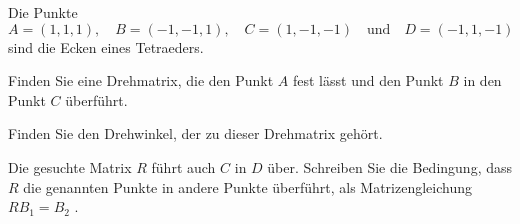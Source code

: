 Die Punkte
\[
A=( 1, 1, 1),\quad
B=(-1,-1, 1),\quad
C=( 1,-1,-1)
\quad\text{und}\quad
D=(-1, 1,-1)
\]
sind die Ecken eines Tetraeders.
\begin{teilaufgaben}
\item
Finden Sie eine Drehmatrix, die den Punkt $A$ fest lässt und den
Punkt $B$ in den Punkt $C$ überführt.
\item
Finden Sie den Drehwinkel, der zu dieser Drehmatrix gehört.
\end{teilaufgaben}


\begin{hinweis}
Die gesuchte Matrix $R$ führt auch $C$ in $D$ über.
Schreiben Sie die Bedingung, dass $R$ die genannten Punkte in andere
Punkte überführt, als Matrizengleichung%
{} $RB_1=B_2$%
.
\end{hinweis}


